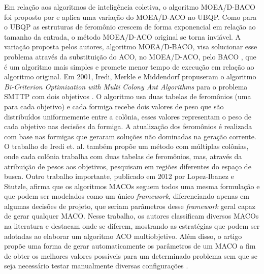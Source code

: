 Em relação aos algoritmos de inteligência coletiva, o algoritmo MOEA/D-BACO foi proposto por  e aplica uma variação do MOEA/D-ACO no \ac{UBQP}. Como para o UBQP as estruturas de feromônio crescem de forma exponencial em relação ao tamanho da entrada, o método MOEA/D-ACO original se torna inviável. A variação proposta pelos autores, algoritmo MOEA/D-BACO, visa solucionar esse problema através da substituição do ACO, no MOEA/D-ACO, pelo \ac{BACO} \cite{baco2006}, que é um algoritmo mais simples e promete menor tempo de execução em relação ao algoritmo original. Em 2001, Iredi, Merkle e Middendorf propuseram o algoritmo \textit{Bi-Criterion Optimization with Multi Colony Ant Algorithms} para o problema \ac{SMTTP} com dois objetivos \cite{BiCriterionAnt}. O algoritmo usa duas tabelas de feromônios (uma para cada objetivo) e cada formiga recebe dois valores de peso que são distribuídos uniformemente entre a colônia, esses valores representam o peso de cada objetivo nas decisões da formiga. A atualização dos feromônios é realizada com base nas formigas que geraram soluções não dominadas na geração corrente. O trabalho de Iredi et. al. também propõe um método com múltiplas colônias, onde cada colônia trabalha com duas tabelas de feromônios, mas, através da atribuição de pesos aos objetivos, pesquisam em regiões diferentes do espaço de busca. Outro trabalho importante, publicado em 2012 por Lopez-Ibanez e Stutzle, afirma que os algoritmos \acp{MACO} seguem todos uma mesma formulação e que podem ser modelados como um único \textit{framework}, diferenciando apenas em algumas decisões de projeto, que seriam parâmetros desse \textit{framework} geral capaz de gerar qualquer MACO. Nesse trabalho, os autores classificam diversos MACOs na literatura e destacam onde se diferem, mostrando as estratégias que podem ser adotadas ao elaborar um algoritmo ACO multiobjetivo. Além disso, o artigo propõe uma forma de gerar automaticamente os parâmetros de um MACO a fim de obter os melhores valores possíveis para um determinado problema sem que se seja necessário testar manualmente diversas configurações \cite{Ibanez2012}.